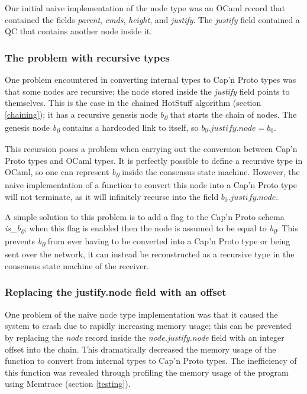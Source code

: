 Our initial naive implementation of the node type was an OCaml record that contained the fields \textit{parent}, \textit{cmds}, \textit{height}, and \textit{justify}. The \textit{justify} field contained a QC that contains another node inside it.

\subsubsection{The problem with recursive types}
One problem encountered in converting internal types to Cap'n Proto types was that some nodes are recursive; the node stored inside the \textit{justify} field points to themselves. This is the case in the chained HotStuff algorithm (section \ref{chaining}); it has a recursive genesis node \textit{b\textsubscript{0}} that starts the chain of nodes. The genesis node \textit{b\textsubscript{0}} contains a hardcoded link to itself, so $ b_0.\textit{justify}.\textit{node} = b_0$.

This recursion poses a problem when carrying out the conversion between Cap'n Proto types and OCaml types. It is perfectly possible to define a recursive type in OCaml, so one can represent \textit{b\textsubscript{0}} inside the consensus state machine. However, the naive implementation of a function to convert this node into a Cap'n Proto type will not terminate, as it will infinitely recurse into the field $ b_0.\textit{justify}.\textit{node} $.

A simple solution to this problem is to add a flag to the Cap'n Proto schema \textit{is\_b\textsubscript{0}}; when this flag is enabled then the node is assumed to be equal to \textit{b\textsubscript{0}}. This prevents \textit{b\textsubscript{0}} from ever having to be converted into a Cap'n Proto type or being sent over the network, it can instead be reconstructed as a recursive type in the consensus state machine of the receiver.

\subsubsection{Replacing the justify.node field with an offset}
One problem of the naive node type implementation was that it caused the system to crash due to rapidly increasing memory usage; this can be prevented by replacing the \textit{node} record inside the \textit{node.justify.node} field with an integer offset into the chain. This dramatically decreased the memory usage of the function to convert from internal types to Cap'n Proto types. The inefficiency of this function was revealed through profiling the memory usage of the program using Memtrace  (section \ref{testing}).

